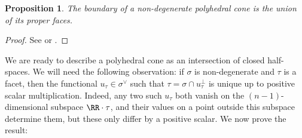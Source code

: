 \documentclass[12pt]{amsart}
\theoremstyle{plain}
\newtheorem{proposition}[theorem]{Proposition}
\begin{document}
\begin{proposition}\label{proposition:boundary}
The boundary of a non-degenerate polyhedral cone is the union of its proper faces.
\end{proposition}
\begin{proof}
See \cite[\S 1.2]{Fulton93} or \cite[\S 1]{Zaman13}.
\end{proof}

%

We are ready to describe a polyhedral cone as an intersection of closed half-spaces.
We will need the following observation:
if $\sigma$ is non-degenerate and $\tau$ is a facet, then the functional $u_\tau \in \sigma^\vee$ such that $\tau = \sigma \cap u_\tau^\perp$ is unique up to positive scalar multiplication.
Indeed, any two such $u_\tau$ both vanish on the $(n-1)$-dimensional subspace $\RR \cdot \tau$, and their values on a point outside this subspace determine them, but these only differ by a positive scalar.
We now prove the result:
\end{document}
